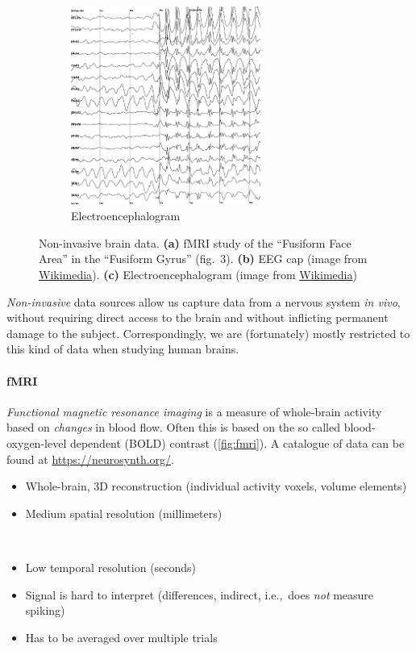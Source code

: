 \documentclass[10pt,letterpaper,oneside]{article}
\begin{document}
\begin{figure}
\begin{subfigure}[b]{0.3\textwidth}
	\end{subfigure}%
	\begin{subfigure}[b]{0.36\textwidth}%
		\centering%
		\includegraphics[height=6.5cm,trim=0 0 1cm 0,clip]{media/eeg_electroencephalogram.png}%
		\caption{Electroencephalogram}
		\label{fig:electroencephalogram}%
	\end{subfigure}
	\caption{Non-invasive brain data. \textbf{(a)} fMRI study of the \enquote{Fusiform Face Area} in the \enquote{Fusiform Gyrus} \cite{kanwisher1997fusiform} (fig.~3). \textbf{(b)} EEG cap (image from \href{https://commons.wikimedia.org/wiki/File:Three_quarter_view_of_EEG_subject.jpg}{Wikimedia}). \textbf{(c)} Electroencephalogram (image from \href{https://commons.wikimedia.org/wiki/File:Spike-waves.png}{Wikimedia})}
\end{figure}

\emph{Non-invasive} data sources allow us capture data from a nervous system \emph{in vivo}, without requiring direct access to the brain and without inflicting permanent damage to the subject. Correspondingly, we are (fortunately) mostly restricted to this kind of data when studying human brains.

\paragraph{fMRI}
\emph{Functional magnetic resonance imaging} is a measure of whole-brain activity based on \emph{changes} in blood flow. Often this is based on the so called blood-oxygen-level dependent (BOLD) contrast (\cref{fig:fmri}).  A catalogue of data can be found at \url{https://neurosynth.org/}.
\begin{multicols}{2}
	\begin{itemize}
		\item[\OPlus] Whole-brain, 3D reconstruction (individual activity voxels, volume elements)
		\item[\OMeh] Medium spatial resolution (millimeters)
	\end{itemize}
	~\vfill\columnbreak
	\begin{itemize}
		\item[\OMinus] Low temporal resolution (seconds)
		\item[\OMinus] Signal is hard to interpret (differences, indirect, i.e.,~does \emph{not} measure spiking)
		\item[\OMinus] Has to be averaged over multiple trials
	\end{itemize}
\end{multicols}
\end{document}
